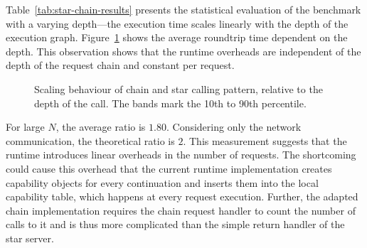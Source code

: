 Table~\ref{tab:star-chain-results} presents the statistical evaluation of the benchmark with a varying depth—the execution time scales linearly with the depth of the execution graph. Figure~\ref{fig:std-chain-abs} shows the average roundtrip time dependent on the depth. This observation shows that the runtime overheads are independent of the depth of the request chain and constant per request.

\begin{table}
\vspace{1em}
  \caption{\label{tab:star-chain-results} Raw benchmark results from star and chain call pattern benchmark on the tcap runtime.}
\end{table}

 \begin{figure}[H]
   \centering
   
   \caption{\label{fig:std-chain-abs} Scaling behaviour of chain and star calling pattern, relative to the depth of the call. The bands mark the 10th to 90th percentile.}
 \end{figure}

For large $N$, the average ratio is $1.80$\@. Considering only the network communication, the theoretical ratio is $2$. This measurement suggests that the runtime introduces linear overheads in the number of requests. The shortcoming could cause this overhead that the current runtime implementation creates capability objects for every continuation and inserts them into the local capability table, which happens at every request execution. Further, the adapted chain implementation requires the chain request handler to count the number of calls to it and is thus more complicated than the simple return handler of the star server.

